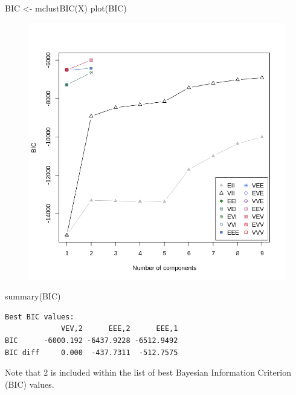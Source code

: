 \documentclass[
  letterpaper,
  DIV=11,
  numbers=noendperiod]{scrartcl}
\newenvironment{Shaded}{\begin{snugshade}}{\end{snugshade}}
\newcommand{\FunctionTok}[1]{\textcolor[rgb]{0.28,0.35,0.67}{#1}}
\newcommand{\NormalTok}[1]{\textcolor[rgb]{0.00,0.23,0.31}{#1}}
\newcommand{\OtherTok}[1]{\textcolor[rgb]{0.00,0.23,0.31}{#1}}
\begin{document}
\begin{Shaded}
\begin{Highlighting}[]
\NormalTok{BIC }\OtherTok{\textless{}{-}} \FunctionTok{mclustBIC}\NormalTok{(X)}
\FunctionTok{plot}\NormalTok{(BIC)}
\end{Highlighting}
\end{Shaded}

\begin{figure}[H]

{\centering \includegraphics{dss-span-analysis-rev5_files/figure-pdf/cell-41-output-1.png}

}

\end{figure}

\begin{Shaded}
\begin{Highlighting}[]
\FunctionTok{summary}\NormalTok{(BIC)}
\end{Highlighting}
\end{Shaded}

\begin{verbatim}
Best BIC values:
             VEV,2      EEE,2      EEE,1
BIC      -6000.192 -6437.9228 -6512.9492
BIC diff     0.000  -437.7311  -512.7575
\end{verbatim}

Note that 2 is included within the list of best Bayesian Information
Criterion (BIC) values.
\end{document}
